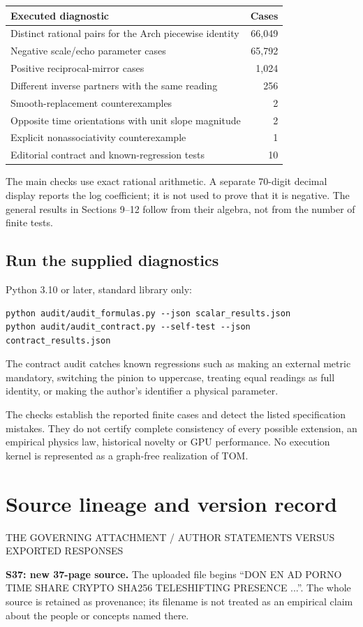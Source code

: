 \documentclass[11pt,a4paper]{article}
\newcommand{\newsec}[2]{\clearpage\section{#1}{\sffamily\footnotesize\color{teal}\MakeUppercase{#2}\par}\vspace{5pt}}
\begin{document}
\begin{tabularx}{\linewidth}{@{}Y r@{}}
\toprule
\textbf{Executed diagnostic} & \textbf{Cases}\\\midrule
Distinct rational pairs for the Arch piecewise identity & 66,049\\
Negative scale/echo parameter cases & 65,792\\
Positive reciprocal-mirror cases & 1,024\\
Different inverse partners with the same reading & 256\\
Smooth-replacement counterexamples & 2\\
Opposite time orientations with unit slope magnitude & 2\\
Explicit nonassociativity counterexample & 1\\
Editorial contract and known-regression tests & 10\\
\bottomrule
\end{tabularx}

The main checks use exact rational arithmetic. A separate 70-digit decimal display reports the log coefficient; it is not used to prove that it is negative. The general results in Sections 9--12 follow from their algebra, not from the number of finite tests.

\subsection{Run the supplied diagnostics}
Python 3.10 or later, standard library only:
\begin{lstlisting}
python audit/audit_formulas.py --json scalar_results.json
python audit/audit_contract.py --self-test --json contract_results.json
\end{lstlisting}
The contract audit catches known regressions such as making an external metric mandatory, switching the pinion to uppercase, treating equal readings as full identity, or making the author's identifier a physical parameter.

\begin{boxx}
The checks establish the reported finite cases and detect the listed specification mistakes. They do not certify complete consistency of every possible extension, an empirical physics law, historical novelty or GPU performance. No execution kernel is represented as a graph-free realization of TOM.
\end{boxx}

\newsec{Source lineage and version record}{The governing attachment / author statements versus exported responses}
\textbf{S37: new 37-page source.} The uploaded file begins ``DON EN AD PORNO TIME SHARE CRYPTO SHA256 TELESHIFTING PRESENCE ...''. The whole source is retained as provenance; its filename is not treated as an empirical claim about the people or concepts named there.
\end{document}
